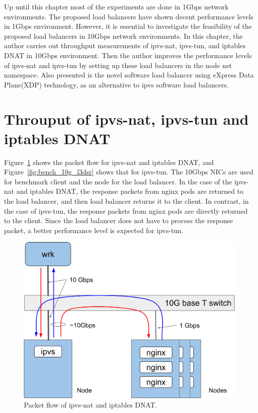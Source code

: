 Up until this chapter most of the experiments are done in 1Gbps network environments.
The proposed load balancers have shown decent performance levels in 1Gbps environment.
However, it is essential to investigate the feasibility of the proposed load balancers in 10Gbps network environments.
In this chapter, the author carries out throughput measurements of ipvs-nat, ipvs-tun, and iptables DNAT in 10Gbps environment.
Then the author improves the performance levels of ipvs-nat and ipvs-tun by setting up these load balancers in the node net namespace.
Also presented is the novel software load balancer using eXpress Data Plane(XDP) technology, as an alternative to ipvs software load balancers.

\section{Throuput of ipvs-nat, ipvs-tun and iptables DNAT}

Figure~\ref{fig:bench_10g} shows the packet flow for ipvs-nat and iptables DNAT, and Figure~\ref{fig:bench_10g_l3dsr} shows that for ipvs-tun.
The 10Gbps NICs are used for benchmark client and the node for the load balancer.
In the case of the ipvs-nat and iptables DNAT, the response packets from nginx pods are returned to the load balancer, and then load balancer returns it to the client.
In contrast, in the case of ipvs-tun, the response packets from nginx pods are directly returned to the client.
Since the load balancer does not have to process the response packet, a better performance level is expected for ipvs-tun.

\begin{figure}[h]
  \centering
  \includegraphics[width=0.8\columnwidth]{Figs/bench_10g}
  \caption{Packet flow of ipvs-nat and iptables DNAT.}
  \label{fig:bench_10g}
\end{figure}

